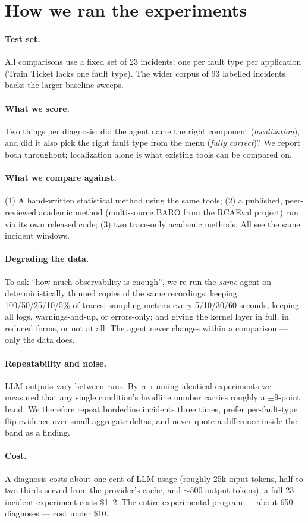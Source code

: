 \section{How we ran the experiments}
\label{sec:method}

\paragraph{Test set.} All comparisons use a fixed set of 23 incidents: one per fault
type per application (Train Ticket lacks one fault type). The wider corpus of 93
labelled incidents backs the larger baseline sweeps.

\paragraph{What we score.} Two things per diagnosis: did the agent name the right
component (\emph{localization}), and did it also pick the right fault type from the
menu (\emph{fully correct})? We report both throughout; localization alone is what
existing tools can be compared on.

\paragraph{What we compare against.} (1) A hand-written statistical method using the
same tools; (2) a published, peer-reviewed academic method (multi-source BARO from the
RCAEval project) run via its own released code; (3) two trace-only academic methods.
All see the same incident windows.

\paragraph{Degrading the data.} To ask ``how much observability is enough'', we
re-run the \emph{same} agent on deterministically thinned copies of the same
recordings: keeping 100/50/25/10/5\% of traces; sampling metrics every 5/10/30/60
seconds; keeping all logs, warnings-and-up, or errors-only; and giving the kernel
layer in full, in reduced forms, or not at all. The agent never changes within a
comparison --- only the data does.

\paragraph{Repeatability and noise.} LLM outputs vary between runs. By re-running
identical experiments we measured that any single condition's headline number carries
roughly a $\pm 9$-point band. We therefore repeat borderline incidents three times,
prefer per-fault-type flip evidence over small aggregate deltas, and never quote a
difference inside the band as a finding.

\paragraph{Cost.} A diagnosis costs about one cent of LLM usage (roughly 25k input
tokens, half to two-thirds served from the provider's cache, and $\sim$500 output
tokens); a full 23-incident experiment costs \$1--2. The entire experimental program
--- about 650 diagnoses --- cost under \$10.
